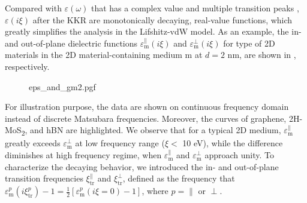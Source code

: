 Compared with $\varepsilon(\omega)$ that has a complex value and
multiple transition peaks ,
$\varepsilon(i \xi)$ after the KKR are monotonically decaying,
real-value functions, which greatly simplifies the analysis in the Lifshitz-vdW model.
%
As an example, the in- and out-of-plane dielectric functions
$\varepsilon_{\mathrm{m}}^{\parallel}(i \xi)$ and
$\varepsilon_{\mathrm{m}}^{\perp}(i \xi)$ for  type of 2D
materials in the 2D material-containing medium m at $d=2$ nm, are
shown in , respectively.
%

\begin{figure}[h]
  \centering
  {eps_and_gm2.pgf}
  \caption{\label{fig:vdw-eps-iv-all} %
  }
\end{figure}
For illustration purpose, the data are shown on continuous frequency
domain instead of discrete Matsubara frequencies. Moreover, the curves
of graphene, 2H-MoS\textsubscript{2}, and hBN are
highlighted. 
%
We observe that for a typical 2D medium,
\(\varepsilon_{\mathrm{m}}^{\parallel}\) greatly exceeds
\(\varepsilon_{\mathrm{m}}^{\perp}\) at low frequency range ($\xi <$
10 eV), while the difference diminishes at high frequency regime, when
$\varepsilon_{\mathrm{m}}^{\parallel}$ and
$\varepsilon_{\mathrm{m}}^{\perp}$ approach unity.
%
To characterize the decaying behavior, we introduced the in- and
out-of-plane transition frequencies \(\xi_{\mathrm{tr}}^{\parallel}\)
and \(\xi_{\mathrm{tr}}^{\perp}\), defined as the frequency that
\(\varepsilon_{\mathrm{m}}^{p}(i \xi^{p}_{\mathrm{tr}}) - 1 =
\frac{1}{2}[\varepsilon_{\mathrm{m}}^{p}(i\xi=0) - 1]\), where
$p=\parallel$ or $\perp$.
%


